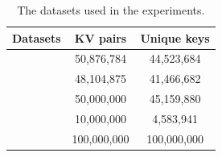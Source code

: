 \begin{table}[t]
	\caption{The datasets used in the experiments.}
	\vspace{-1.5em}
	\label{table:exp_data_sets}
	\centering
\begin{tabular}{|c|c|c|}
	\hline
	Datasets & KV pairs & Unique keys\\ \hline
	\dstwitter &50,876,784 & 44,523,684\\ \hline
	\dsreddit & 48,104,875 & 41,466,682 \\ \hline
	\dstpch &50,000,000 & 45,159,880\\ \hline
	\dsali &10,000,000 & 4,583,941\\ \hline
	\dsrandom & 100,000,000& 100,000,000 \\ \hline
\end{tabular}
\end{table}



